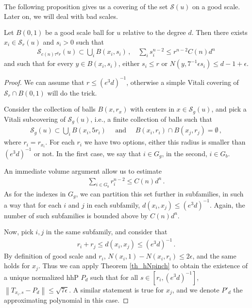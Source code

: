 \documentclass[11pt]{article}
\begin{document}
The following proposition gives us a covering of the set ${\mathcal{S}}(u)$ on a good scale. Later on, we will deal with bad scales. 
\begin{proposition}
 Let $B(0,1)$ be a good scale ball for $u$ relative to the degree $d$. Then there exists $x_i\in {\mathcal{S}}_r(u)$ and $s_i>0$ such that
 \begin{gather}
  {\mathcal{S}}_{c(n)\tau^d r}(u)\subset \bigcup_{i} B(x_i,s_i)\, , \quad \sum_i s_i^{n-2}\leq r^{n-2} C(n)d^n
 \end{gather}
and such that for every $y\in B(x_i,s_i)$, either $s_i\leq r$ or $ N(y,7^{-1}\epsilon s_i)\leq d-1+\epsilon$.
\end{proposition}
\begin{proof}
We can assume that $r\leq (e^3d)^{-1}$, otherwise a simple Vitali covering of ${\mathcal{S}}_r\cap B(0,1)$ will do the trick.
 
 Consider the collection of balls $B(x,r_x)$ with centers in $x\in {\mathcal{S}}_g(u)$, and pick a Vitali subcovering of ${\mathcal{S}}_g(u)$, i.e., a finite collection of balls such that
 \begin{gather}
  {\mathcal{S}}_g(u)\subset \bigcup_{i} B(x_i,5r_i)\quad \text{  and  }\quad B(x_i,r_i)\cap B(x_j,r_j)=\emptyset\, ,
 \end{gather}
where $r_i=r_{x_i}$. For each $r_i$ we have two options, either this radius is smaller than $(e^3d)^{-1}$ or not. In the first case, we say that $i\in G_g$, in the second, $i\in G_b$.

An immediate volume argument allow us to estimate
\begin{gather}
 \sum_{i\in G_b} r_i^{n-2}\leq C(n) d^n\, .
\end{gather}
As for the indexes in $G_g$, we can partition this set further in subfamilies, in such a way that for each $i$ and $j$ in each subfamily, $d(x_i,x_j)\leq (e^3d)^{-1}$. Again, the number of such subfamilies is bounded above by $C(n)d^n$.

Now, pick $i,j$ in the same subfamily, and consider that
\begin{gather}
 r_i+r_j\leq d(x_i,x_j)\leq (e^3d)^{-1}\, .
\end{gather}
By definition of good scale and $r_i$, $N(x_i,1)- N(x_i,r_i)\leq 2\epsilon$, and the same holds for $x_j$. Thus we can apply Theorem \ref{th_hNpinch} to obtain the existence of a unique normalized hhP $P_d$ such that for all $s\in [r_i,(e^3d)^{-1}]$, ${\left\|{T_{x_i,s}-P_d}\right\|}\leq \sqrt{7\epsilon}$. A similar statement is true for $x_j$, and we denote $P'_d$ the approximating polynomial in this case.


\end{proof}
\end{document}
